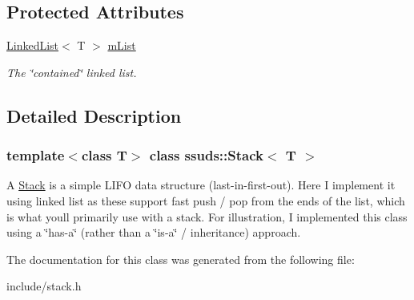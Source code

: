 \subsection*{Protected Attributes}
\begin{DoxyCompactItemize}
\item 
\mbox{\label{classssuds_1_1_stack_a87dfe9298574e9d29dbbc427515b6d81}} 
\mbox{\hyperlink{classssuds_1_1_linked_list}{Linked\+List}}$<$ T $>$ \mbox{\hyperlink{classssuds_1_1_stack_a87dfe9298574e9d29dbbc427515b6d81}{m\+List}}
\begin{DoxyCompactList}\small\item\em The \char`\"{}contained\char`\"{} linked list. \end{DoxyCompactList}\end{DoxyCompactItemize}


\subsection{Detailed Description}
\subsubsection*{template$<$class T$>$\newline
class ssuds\+::\+Stack$<$ T $>$}

A \mbox{\hyperlink{classssuds_1_1_stack}{Stack}} is a simple L\+I\+FO data structure (last-\/in-\/first-\/out). Here I implement it using linked list as these support fast push / pop from the ends of the list, which is what you\textquotesingle{}ll primarily use with a stack. For illustration, I implemented this class using a \char`\"{}has-\/a\char`\"{} (rather than a \char`\"{}is-\/a\char`\"{} / inheritance) approach. 

The documentation for this class was generated from the following file\+:\begin{DoxyCompactItemize}
\item 
include/stack.\+h\end{DoxyCompactItemize}
